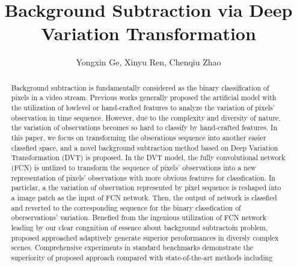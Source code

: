 \documentclass[journal]{IEEEtran}
\begin{document}
\title{Background Subtraction via Deep Variation Transformation}

\author{Yongxin Ge, 
        Xinyu Ren, 
        Chenqiu Zhao}



\maketitle



\begin{abstract}
Background subtraction is fundamentally considered as the binary classification of pixels in a video stream. 
Previous works generally proposed the artificial model with the utilization of lowlevel or hand-crafted features to analyze the variation of pixels' observation in time sequence.
However, due to the complexity and diversity of nature,
the variation of observations becomes so hard to classify by hand-crafted features.
In this paper, we focus on transforming the obserations sequence into another easier classfied space,
and a novel background subtraction method based on Deep Variation Transformation (DVT) is proposed.
In the DVT model,
the fully convolutional network (FCN) is untlized to transform the sequence of pixels' observations into a new representation of pixels' observations with more obvious features for classfication.
%
In particlar, 
a the variation of observation represented by pixel sequence is reshaped into a image patch as the input of FCN network.
%
Then, the output of network is classfied and reverted to the corresponding sequence for the binary classfication of oberservations' variation.
%
Benefied from the ingenious utilization of FCN network leading by our clear congnition of essence about background subtractoin problem,
proposed approached adaptively generate superior peroformances in diversly complex scenes.
%
Comprehensive experiments in standard benchmarks demonstrate the superiority of proposed approach compared with state-of-the-art methods including 
% 
% 
% 
\end{abstract}
\end{document}
